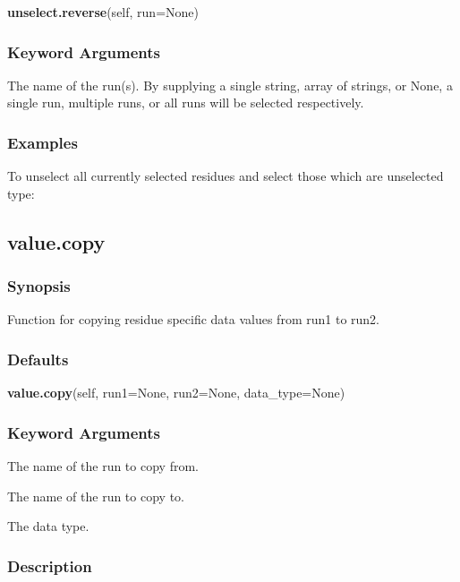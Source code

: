 \textsf{\textbf{unselect.reverse}(self, run=None)}


\subsubsection{Keyword Arguments}


  The name of the run(s).  By supplying a single string, array of strings, or None, a single run, multiple runs, or all runs will be selected respectively.

\subsubsection{Examples}

To unselect all currently selected residues and select those which are unselected type:




\newpage

\subsection{value.copy}


\subsubsection{Synopsis}

Function for copying residue specific data values from run1 to run2.

\subsubsection{Defaults}

\textsf{\textbf{value.copy}(self, run1=None, run2=None, data\_type=None)}


\subsubsection{Keyword Arguments}


  The name of the run to copy  from.

  The name of the run to copy  to.

  The data type.

\subsubsection{Description}

